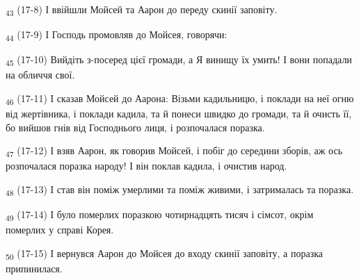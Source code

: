 \begin{tcolorbox}
\textsubscript{43} (17-8) І ввійшли Мойсей та Аарон до переду скинії заповіту.
\end{tcolorbox}
\begin{tcolorbox}
\textsubscript{44} (17-9) І Господь промовляв до Мойсея, говорячи:
\end{tcolorbox}
\begin{tcolorbox}
\textsubscript{45} (17-10) Вийдіть з-посеред цієї громади, а Я винищу їх умить! І вони попадали на обличчя свої.
\end{tcolorbox}
\begin{tcolorbox}
\textsubscript{46} (17-11) І сказав Мойсей до Аарона: Візьми кадильницю, і поклади на неї огню від жертівника, і поклади кадила, та й понеси швидко до громади, та й очисть її, бо вийшов гнів від Господнього лиця, і розпочалася поразка.
\end{tcolorbox}
\begin{tcolorbox}
\textsubscript{47} (17-12) І взяв Аарон, як говорив Мойсей, і побіг до середини зборів, аж ось розпочалася поразка народу! І він поклав кадила, і очистив народ.
\end{tcolorbox}
\begin{tcolorbox}
\textsubscript{48} (17-13) І став він поміж умерлими та поміж живими, і затрималась та поразка.
\end{tcolorbox}
\begin{tcolorbox}
\textsubscript{49} (17-14) І було померлих поразкою чотирнадцять тисяч і сімсот, окрім померлих у справі Корея.
\end{tcolorbox}
\begin{tcolorbox}
\textsubscript{50} (17-15) І вернувся Аарон до Мойсея до входу скинії заповіту, а поразка припинилася.
\end{tcolorbox}
